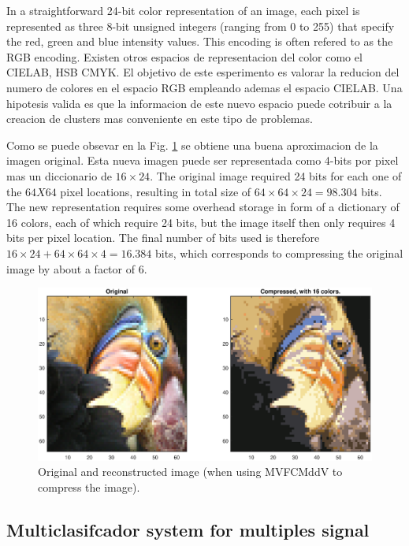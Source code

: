 \documentclass[12pt]{article}
\begin{document}
In a straightforward 24-bit color representation of an image, each pixel is represented as three 8-bit unsigned integers (ranging from 0 to 255) that specify the red, green and blue intensity values. This encoding is often refered to as the RGB encoding. Existen otros espacios de representacion del color como el CIELAB, HSB CMYK. El objetivo de este esperimento es valorar la reducion del numero de colores en el espacio RGB empleando ademas el espacio CIELAB. Una hipotesis valida es que la informacion de este nuevo espacio puede cotribuir a la creacion de clusters mas conveniente en este tipo de problemas.  

Como se puede obsevar en la Fig. \ref{fig:image_compress} se obtiene una buena aproximacion de la imagen original. Esta nueva imagen puede ser representada como 4-bits por pixel mas un diccionario de $16\times24$. The original image required 24 bits for each one of the $64X64$ pixel locations, resulting in total size of $64\times64\times24 = 98.304$ bits. The new representation requires some overhead storage in form of a dictionary of 16 colors, each of which require 24 bits, but the image itself then only requires 4 bits per pixel location. The final number of bits used is therefore $16\times24 + 64\times64\times4 = 16.384$ bits, which corresponds to compressing the original image by about a factor of 6.


\begin{figure}[h]
\centering
\includegraphics[width=5.5in]{../out/image-compress-16.eps}
\caption{Original and reconstructed image (when using MVFCMddV to compress the image).}
\label{fig:image_compress}
\end{figure}  


\subsection{Multiclasifcador system for multiples signal}
\end{document}
